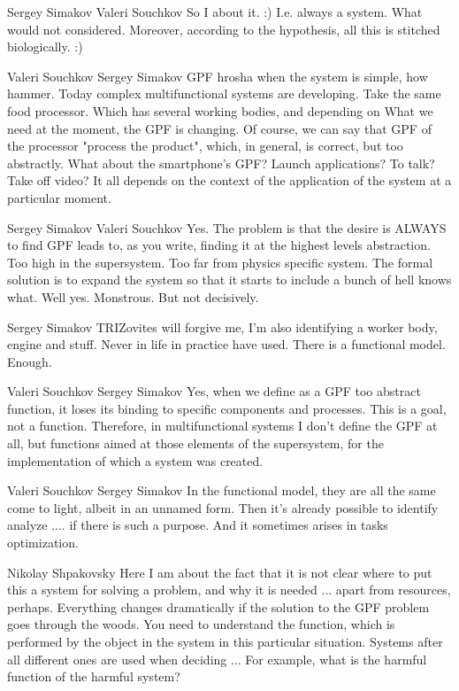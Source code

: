 \documentclass[11pt,a4paper]{article}
\begin{document}
Sergey Simakov Valeri Souchkov So I about it. :) I.e. always a system. What
would not considered. Moreover, according to the hypothesis, all this is
stitched biologically. :)

Valeri Souchkov Sergey Simakov GPF hrosha when the system is simple, how
hammer. Today complex multifunctional systems are developing. Take the same
food processor. Which has several working bodies, and depending on What we
need at the moment, the GPF is changing. Of course, we can say that GPF of the
processor "process the product", which, in general, is correct, but too
abstractly. What about the smartphone’s GPF? Launch applications? To talk?
Take off video? It all depends on the context of the application of the system
at a particular moment.

Sergey Simakov Valeri Souchkov Yes. The problem is that the desire is ALWAYS
to find GPF leads to, as you write, finding it at the highest levels
abstraction. Too high in the supersystem. Too far from physics specific
system. The formal solution is to expand the system so that it starts to
include a bunch of hell knows what. Well yes. Monstrous. But not decisively.

Sergey Simakov TRIZovites will forgive me, I’m also identifying a worker body,
engine and stuff. Never in life in practice have used. There is a functional
model. Enough.

Valeri Souchkov Sergey Simakov Yes, when we define as a GPF too abstract
function, it loses its binding to specific components and processes. This is a
goal, not a function. Therefore, in multifunctional systems I don’t define the
GPF at all, but functions aimed at those elements of the supersystem, for the
implementation of which a system was created.

Valeri Souchkov Sergey Simakov In the functional model, they are all the same
come to light, albeit in an unnamed form. Then it’s already possible to
identify analyze .... if there is such a purpose. And it sometimes arises in
tasks optimization.

Nikolay Shpakovsky Here I am about the fact that it is not clear where to put
this a system for solving a problem, and why it is needed ... apart from
resources, perhaps. Everything changes dramatically if the solution to the GPF
problem goes through the woods. You need to understand the function, which is
performed by the object in the system in this particular situation. Systems
after all different ones are used when deciding ... For example, what is the
harmful function of the harmful system?
\end{document}
